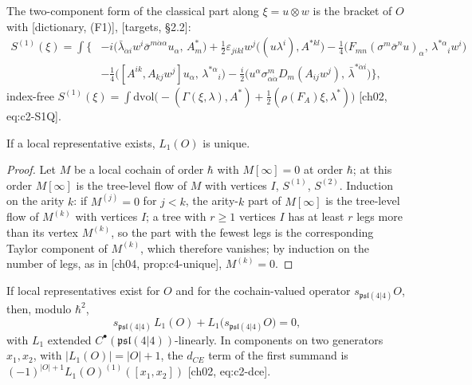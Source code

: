 The two-component form of the classical part along $\xi=u\otimes w$ is the bracket of $O$ with [dictionary, (F1)], [targets, §2.2]:
\begin{equation}
\begin{aligned}
S^{(1)}(\xi)=\int\Big\{&-i\big(\bar\lambda_{\dot\alpha i}w^i\bar\sigma^{m\dot\alpha\alpha}u_\alpha,\,A^*_m\big)+\tfrac12\varepsilon_{jikl}w^j\big((u\lambda^i),A^{*kl}\big)-\tfrac14\big(F_{mn}(\sigma^m\bar\sigma^nu)_\alpha,\,\lambda^{*\alpha}{}_iw^i\big)\\
&-\tfrac14\big([A^{ik},A_{kj}w^j]u_\alpha,\,\lambda^{*\alpha}{}_i\big)-\tfrac i2\big(u^\alpha\sigma^m_{\alpha\dot\alpha}D_m(A_{ij}w^j),\,\bar\lambda^{*\dot\alpha i}\big)\Big\},
\end{aligned}
\label{eq:o-S1xi}
\end{equation}
index-free $S^{(1)}(\xi)=\int\mathrm{dvol}\big(-(\Gamma(\xi,\lambda),A^*)+\tfrac12(\rho(F_A)\xi,\lambda^*)\big)$ [ch02, eq:c2-S1Q].

\begin{proposition}[Uniqueness]
\label{prop:o-unique}
If a local representative exists, $L_1(O)$ is unique.
\end{proposition}

\begin{proof}
Let $M$ be a local cochain of order $\hbar$ with $M[\infty]=0$ at order $\hbar$; at this order $M[\infty]$ is the tree-level flow of $M$ with vertices $I$, $S^{(1)}$, $S^{(2)}$. Induction on the arity $k$: if $M^{(j)}=0$ for $j<k$, the arity-$k$ part of $M[\infty]$ is the tree-level flow of $M^{(k)}$ with vertices $I$; a tree with $r\ge1$ vertices $I$ has at least $r$ legs more than its vertex $M^{(k)}$, so the part with the fewest legs is the corresponding Taylor component of $M^{(k)}$, which therefore vanishes; by induction on the number of legs, as in [ch04, prop:c4-unique], $M^{(k)}=0$.
\end{proof}

\begin{theorem}
\label{thm:o-cocycle}
If local representatives exist for $O$ and for the cochain-valued operator $s_{\mathfrak{psl}(4|4)}O$, then, modulo $\hbar^2$,
\begin{equation}
s_{\mathfrak{psl}(4|4)}\,L_1(O)+L_1\big(s_{\mathfrak{psl}(4|4)}O\big)=0 ,
\label{eq:o-cocycle}
\end{equation}
with $L_1$ extended $C^\bullet(\mathfrak{psl}(4|4))$-linearly. In components on two generators $x_1,x_2$, with $|L_1(O)|=|O|+1$, the $d_{CE}$ term of the first summand is $(-1)^{|O|+1}L_1(O)^{(1)}([x_1,x_2])$ [ch02, eq:c2-dce].
\end{theorem}

